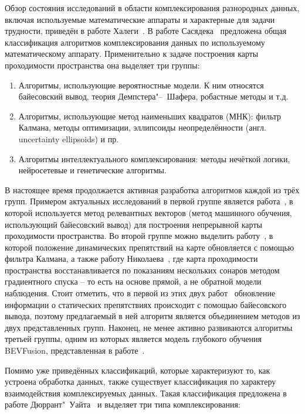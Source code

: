 Обзор состояния исследований в области комплексирования разнородных данных, включая используемые математические аппараты и характерные для задачи трудности, приведён в работе Халеги~\cite{khaleghi2013multisensor}. В работе Сасядека~\cite{sasiadek2002sensor} предложена общая классификация алгоритмов комплексирования данных по используемому математическому аппарату. Применительно к задаче построения карты проходимости пространства она выделяет три группы:

\begin{enumerate}
	\item Алгоритмы, использующие вероятностные модели. К ним относятся байесовский вывод, теория Демпстера"--~Шафера, робастные методы и т.д.
	\item Алгоритмы, использующие метод наименьших квадратов (МНК): фильтр Калмана, методы оптимизации, эллипсоиды неопределённости (англ. uncertainty ellipsoids) и пр.
	\item Алгоритмы интеллектуального комплексирования: методы нечёткой логики, нейросетевые и генетические алгоритмы. 
\end{enumerate}

В настоящее время продолжается активная разработка алгоритмов каждой из трёх групп. Примером актуальных исследований в первой группе является работа~\cite{duong2022autonomous}, в которой используется метод релевантных векторов (метод машинного обучения, использующий байесовский вывод) для построения непрерывной карты проходимости пространства. Во второй группе можно выделить работу~\cite{9274841}, в которой положение динамических препятствий на карте обновляется с помощью фильтра Калмана, а также работу Николаева~\cite{shvets2016occupancy}, где карта проходимости пространства восстанавливается по показаниям нескольких сонаров методом градиентного спуска -- то есть на основе прямой, а не обратной модели наблюдения. Стоит отметить, что в первой из этих двух работ~\cite{9274841} обновление информации о статических препятствиях происходит с помощью байесовского вывода, поэтому предлагаемый в ней алгоритм является объединением методов из двух представленных групп. Наконец, не менее активно развиваются алгоритмы третьей группы, одним из которых является модель глубокого обучения BEVFusion, представленная в работе~\cite{liu2024bevfusionmultitaskmultisensorfusion}.

Помимо уже приведённых классификаций, которые характеризуют то, как устроена обработка данных, также существует классификация по характеру взаимодействия комплексируемых данных. Такая классификация предложена в работе Дюррант"~Уайта~\autocite{durrantwhyte1988} и выделяет три типа комплексирования:

